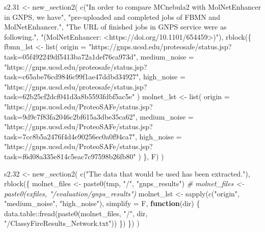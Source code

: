 \documentclass[
]{article}
\newenvironment{Shaded}{\begin{snugshade}}{\end{snugshade}}
\newcommand{\AttributeTok}[1]{\textcolor[rgb]{0.77,0.63,0.00}{#1}}
\newcommand{\CommentTok}[1]{\textcolor[rgb]{0.56,0.35,0.01}{\textit{#1}}}
\newcommand{\ControlFlowTok}[1]{\textcolor[rgb]{0.13,0.29,0.53}{\textbf{#1}}}
\newcommand{\FloatTok}[1]{\textcolor[rgb]{0.00,0.00,0.81}{#1}}
\newcommand{\FunctionTok}[1]{\textcolor[rgb]{0.00,0.00,0.00}{#1}}
\newcommand{\NormalTok}[1]{#1}
\newcommand{\OtherTok}[1]{\textcolor[rgb]{0.56,0.35,0.01}{#1}}
\newcommand{\SpecialCharTok}[1]{\textcolor[rgb]{0.00,0.00,0.00}{#1}}
\newcommand{\StringTok}[1]{\textcolor[rgb]{0.31,0.60,0.02}{#1}}
\begin{document}
\begin{Shaded}
\begin{Highlighting}[]
\NormalTok{s2}\FloatTok{.31} \OtherTok{\textless{}{-}} \FunctionTok{new\_section2}\NormalTok{(}
  \FunctionTok{c}\NormalTok{(}\StringTok{"In order to compare MCnebula2 with MolNetEnhancer in GNPS, we have"}\NormalTok{,}
    \StringTok{"pre{-}uploaded and completed jobs of FBMN and MolNetEnhancer."}\NormalTok{,}
    \StringTok{"The URL of finished jobs in GNPS service were as following."}\NormalTok{,}
    \StringTok{"(MolNetEnhancer: \textless{}https://doi.org/10.1101/654459\textgreater{})"}\NormalTok{),}
  \FunctionTok{rblock}\NormalTok{(\{}
\NormalTok{    fbmn\_lst }\OtherTok{\textless{}{-}} \FunctionTok{list}\NormalTok{(}
      \AttributeTok{origin =}
        \StringTok{"https://gnps.ucsd.edu/proteosafe/status.jsp?task=05f492249df5413ba72a1def76ca973d"}\NormalTok{,}
      \AttributeTok{medium\_noise =} 
        \StringTok{"https://gnps.ucsd.edu/proteosafe/status.jsp?task=c65abe76cd9846c99f1ae47ddbd34927"}\NormalTok{,}
      \AttributeTok{high\_noise =}
        \StringTok{"https://gnps.ucsd.edu/proteosafe/status.jsp?task=62b25cf2dcf041d3a8b5593fdbf5ac5e"}
\NormalTok{    )}
\NormalTok{    molnet\_lst }\OtherTok{\textless{}{-}} \FunctionTok{list}\NormalTok{(}
      \AttributeTok{origin =}
        \StringTok{"https://gnps.ucsd.edu/ProteoSAFe/status.jsp?task=9d9c7f83fa2046c2bf615a3dbe35ca62"}\NormalTok{,}
      \AttributeTok{medium\_noise =} 
        \StringTok{"https://gnps.ucsd.edu/ProteoSAFe/status.jsp?task=7cc8b5a2476f4d4e90256ec0a0f94ca7"}\NormalTok{,}
      \AttributeTok{high\_noise =}
        \StringTok{"https://gnps.ucsd.edu/ProteoSAFe/status.jsp?task=f6d08a335e814c5eac7c97598b26fb80"}
\NormalTok{    )}
\NormalTok{  \}, F)}
\NormalTok{)}

\NormalTok{s2}\FloatTok{.32} \OtherTok{\textless{}{-}} \FunctionTok{new\_section2}\NormalTok{(}
  \FunctionTok{c}\NormalTok{(}\StringTok{"The data that would be used has been extracted."}\NormalTok{),}
  \FunctionTok{rblock}\NormalTok{(\{}
\NormalTok{    molnet\_files }\OtherTok{\textless{}{-}} \FunctionTok{paste0}\NormalTok{(tmp, }\StringTok{"/"}\NormalTok{, }\StringTok{"gnps\_results"}\NormalTok{)}
    \CommentTok{\# molnet\_files \textless{}{-} paste0(exfiles, "/evaluation/gnps\_results")}
\NormalTok{    molnet\_lst }\OtherTok{\textless{}{-}} \FunctionTok{sapply}\NormalTok{(}\FunctionTok{c}\NormalTok{(}\StringTok{"origin"}\NormalTok{, }\StringTok{"medium\_noise"}\NormalTok{, }\StringTok{"high\_noise"}\NormalTok{), }\AttributeTok{simplify =}\NormalTok{ F,}
      \ControlFlowTok{function}\NormalTok{(dir) \{}
\NormalTok{        data.table}\SpecialCharTok{::}\FunctionTok{fread}\NormalTok{(}\FunctionTok{paste0}\NormalTok{(molnet\_files, }\StringTok{"/"}\NormalTok{, dir, }\StringTok{"/ClassyFireResults\_Network.txt"}\NormalTok{))}
\NormalTok{      \})}
\NormalTok{  \})}
\NormalTok{)}


\end{Highlighting}
\end{Shaded}
\end{document}

